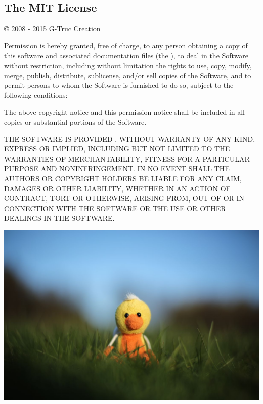 \documentclass{scrartcl}
\numberwithin{figure}{subsection}
\begin{document}
\pagebreak{}

\subsection*{\hypertarget{mit}{The MIT License}}

\copyright{} 2008 - 2015 G-Truc Creation

Permission is hereby granted, free of charge, to any person obtaining a copy of this software and associated documentation files (the ), to deal in the Software without restriction, including without limitation the rights to use, copy, modify, merge, publish, distribute, sublicense, and/or sell copies of the Software, and to permit persons to whom the Software is furnished to do so, subject to the following conditions:

The above copyright notice and this permission notice shall be included in all copies or substantial portions of the Software.

THE SOFTWARE IS PROVIDED , WITHOUT WARRANTY OF ANY KIND, EXPRESS OR IMPLIED, INCLUDING BUT NOT LIMITED TO THE WARRANTIES OF MERCHANTABILITY, FITNESS FOR A PARTICULAR PURPOSE AND NONINFRINGEMENT. IN NO EVENT SHALL THE AUTHORS OR COPYRIGHT HOLDERS BE LIABLE FOR ANY CLAIM, DAMAGES OR OTHER LIABILITY, WHETHER IN AN ACTION OF CONTRACT, TORT OR OTHERWISE, ARISING FROM, OUT OF OR IN CONNECTION WITH THE SOFTWARE OR THE USE OR OTHER DEALINGS IN THE SOFTWARE.

\begin{center}
    \includegraphics[width=\textwidth]{duck-large2}
\end{center}
\end{document}
